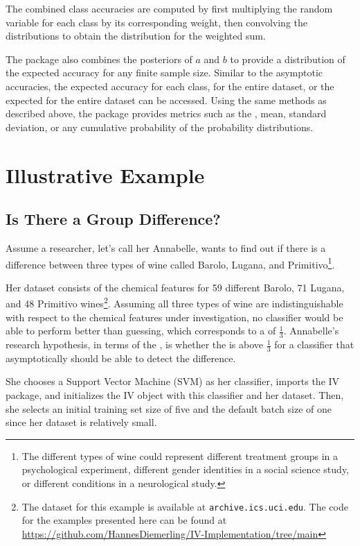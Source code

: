 \documentclass[article]{jss}
\begin{document}
The combined class accuracies are computed by first multiplying the random variable for each class by its corresponding weight, then convolving the distributions to obtain the distribution for the weighted sum.

The package also combines the posteriors of $a$ and $b$ to provide a distribution of the expected accuracy for any finite sample size. Similar to the asymptotic accuracies, the expected accuracy for each class, for the entire dataset, or the expected  for the entire dataset can be accessed. Using the same methods as described above, the package provides metrics such as the , mean, standard deviation, or any cumulative probability of the probability distributions.

\section{Illustrative Example} \label{sec:example}

\subsection{Is There a Group Difference?} \label{sec:ex_group_diff}

Assume a researcher, let’s call her Annabelle, wants to find out if there is a difference between three types of wine called Barolo, Lugana, and Primitivo\footnote{The different types of wine could represent different treatment groups in a psychological experiment, different gender identities in a social science study, or different conditions in a neurological study.}.

Her dataset consists of the chemical features for 59 different Barolo, 71 Lugana, and 48 Primitivo wines\footnote{The dataset for this example is available at \texttt{archive.ics.uci.edu}. The  code for the examples presented here can be found at \url{https://github.com/HannesDiemerling/IV-Implementation/tree/main}}.
Assuming all three types of wine are indistinguishable with respect to the chemical features under investigation, no classifier would be able to perform better than guessing, which corresponds to a  of $\frac{1}{3}$.
Annabelle’s research hypothesis, in terms of the , is whether the  is above $\frac{1}{3}$ for a classifier that asymptotically should be able to detect the difference.

She chooses a Support Vector Machine (SVM) as her classifier, imports the IV package, and initializes the IV object with this classifier and her dataset.
Then, she selects an initial training set size of five and the default batch size of one since her dataset is relatively small.
\end{document}
